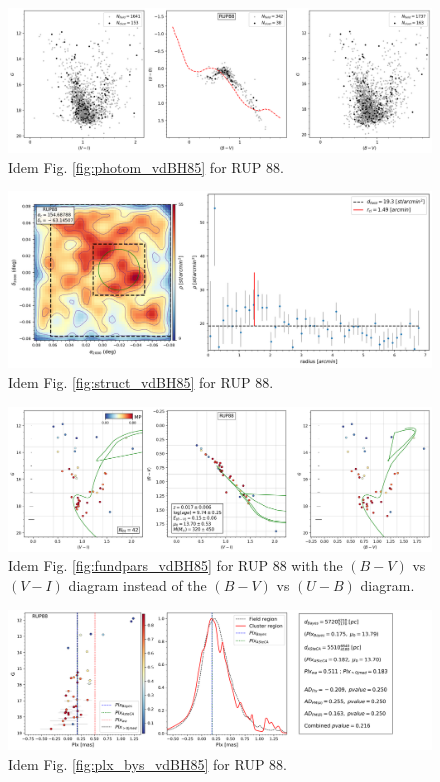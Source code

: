 \documentclass[draft]{aa}
\begin{document}
\begin{figure}[ht]
    \centering
    \includegraphics[width=\hsize]{../figs/obs_RUP88.png}
    \caption{Idem Fig. \ref{fig:photom_vdBH85} for RUP 88.}
    \label{fig31}
\end{figure}
\begin{figure}[ht]
    \centering
    \includegraphics[width=\hsize]{../figs/dmap_rup88.png}
    \caption{Idem Fig. \ref{fig:struct_vdBH85} for RUP 88.}
    \label{fig32}
\end{figure}
\begin{figure}[ht]
    \centering
    \includegraphics[width=\hsize]{../figs/cmds_rup88.png}
    \caption{Idem Fig. \ref{fig:fundpars_vdBH85} for RUP 88
with the $(B-V)$ vs $(V-I)$ diagram instead of the $(B-V)$ vs $(U-B)$
diagram.}
    \label{fig33}
\end{figure}
\begin{figure}[ht]
    \centering
    \includegraphics[width=\hsize]{../figs/plx_RUP88.png}
    \caption{Idem Fig. \ref{fig:plx_bys_vdBH85} for RUP 88.}
    \label{fig34}
\end{figure}
\end{document}

